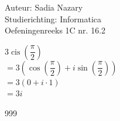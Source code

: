 \documentclass[a4paper]{article}
\begin{document}
  
\noindent \large Auteur: Sadia Nazary \\
\noindent \large Studierichting: Informatica\\
\noindent \large Oefeningenreeks 1C nr. 16.2\\

\medskip

\normalsize

$3 \operatorname{cis}\left(\dfrac{\pi}{2}\right)$ \\

$= 3 \left(\cos\left(\dfrac{\pi}{2}\right) + i \sin\left(\dfrac{\pi}{2}\right)\right)$ \\

$= 3 (0 + i \cdot 1)$ \\

$= 3i$

\begin{thebibliography}{999}
\end{thebibliography}
\end{document}
